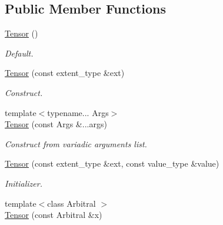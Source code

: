 \subsection*{Public Member Functions}
\begin{DoxyCompactItemize}
\item 
\hypertarget{classbtas_1_1_tensor_aca1ee2c3077f557ed5e1fd278aa6201a}{
\hyperlink{classbtas_1_1_tensor_aca1ee2c3077f557ed5e1fd278aa6201a}{Tensor} ()}
\label{classbtas_1_1_tensor_aca1ee2c3077f557ed5e1fd278aa6201a}

\begin{DoxyCompactList}\small\item\em Default. \item\end{DoxyCompactList}\item 
\hypertarget{classbtas_1_1_tensor_aba3aa7dacc6bbd1df66e97f08196ccca}{
\hyperlink{classbtas_1_1_tensor_aba3aa7dacc6bbd1df66e97f08196ccca}{Tensor} (const extent\_\-type \&ext)}
\label{classbtas_1_1_tensor_aba3aa7dacc6bbd1df66e97f08196ccca}

\begin{DoxyCompactList}\small\item\em Construct. \item\end{DoxyCompactList}\item 
\hypertarget{classbtas_1_1_tensor_a70fa70f7c17aea7da56c4e61c7a52365}{
{\footnotesize template$<$typename... Args$>$ }\\\hyperlink{classbtas_1_1_tensor_a70fa70f7c17aea7da56c4e61c7a52365}{Tensor} (const Args \&...args)}
\label{classbtas_1_1_tensor_a70fa70f7c17aea7da56c4e61c7a52365}

\begin{DoxyCompactList}\small\item\em Construct from variadic arguments list. \item\end{DoxyCompactList}\item 
\hypertarget{classbtas_1_1_tensor_a13e4efffe4a8cf7e1dc801f9e2d82703}{
\hyperlink{classbtas_1_1_tensor_a13e4efffe4a8cf7e1dc801f9e2d82703}{Tensor} (const extent\_\-type \&ext, const value\_\-type \&value)}
\label{classbtas_1_1_tensor_a13e4efffe4a8cf7e1dc801f9e2d82703}

\begin{DoxyCompactList}\small\item\em Initializer. \item\end{DoxyCompactList}\item 
\hypertarget{classbtas_1_1_tensor_a49539e81d4156afe74428ce3aa69bfe3}{
{\footnotesize template$<$class Arbitral $>$ }\\\hyperlink{classbtas_1_1_tensor_a49539e81d4156afe74428ce3aa69bfe3}{Tensor} (const Arbitral \&x)}
\label{classbtas_1_1_tensor_a49539e81d4156afe74428ce3aa69bfe3}


\end{DoxyCompactItemize}
